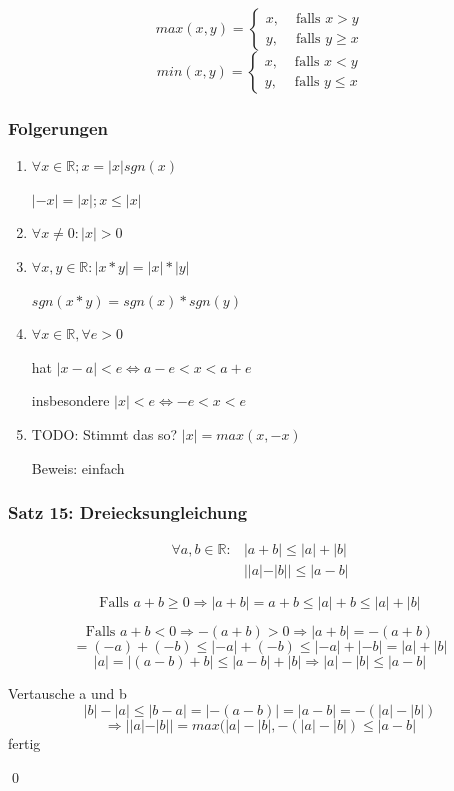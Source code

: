 \documentclass[fleqn]{scrartcl}
\renewenvironment{proof}{{\bfseries Beweis }}{\qed}
\begin{document}
\[
  max(x,y) = \left\{ 
    \begin{array}{rl}
       x, & \text{ falls } x>y \\
       y, & \text{ falls } y\geq x
    \end{array}\right.
\]
\[
  min(x,y) = \left\{ 
    \begin{array}{rl}
       x, & \text{ falls } x<y \\
       y, & \text{ falls } y\leq x
    \end{array}\right.
\]

\subsubsection{Folgerungen}

\begin{enumerate}
  \item $\forall x \in \mathbb{R};x=|x|sgn(x)$
  
    $|-x|=|x|;x \leq |x|$
  \item $\forall x \neq 0: |x|>0$
  \item $\forall x,y \in \mathbb{R}: |x*y|=|x|*|y|$
  
    $sgn(x*y)=sgn(x)*sgn(y)$
  \item $\forall x \in \mathbb{R}, \forall e >0$
  
    hat $|x-a|<e \Longleftrightarrow a-e<x<a+e$
    
    insbesondere $|x|<e \Longleftrightarrow -e<x<e$
  \item TODO: Stimmt das so? $|x|=max(x,-x)$
  
        Beweis: einfach
\end{enumerate}

\subsubsection{Satz 15: Dreiecksungleichung}

\begin{align*}
  \forall a,b \in \mathbb{R}: & |a+b| \leq |a|+|b|\\
                              & ||a|-|b||\leq|a-b|
\end{align*}

\begin{proof}

\[\text{Falls } a+b \geq 0 \Longrightarrow |a+b|=a+b \leq |a|+b\leq|a|+|b|\]

\[\text{Falls } a+b < 0 \Longrightarrow -(a+b)>0 \Longrightarrow |a+b|=-(a+b)\]
\[=(-a)+(-b)\leq |-a|+(-b)\leq |-a|+ |-b|=|a|+|b|\]
\[|a|=|(a-b)+b|\leq|a-b|+|b|\Longrightarrow |a|-|b|\leq|a-b|\]

Vertausche a und b
\[|b|-|a|\leq |b-a|=|-(a-b)|=|a-b|=-(|a|-|b|)\]
\[\Longrightarrow||a|-|b||=max(|a|-|b|,-(|a|-|b|)\leq |a-b|\]
fertig

\end{proof}
\end{document}
